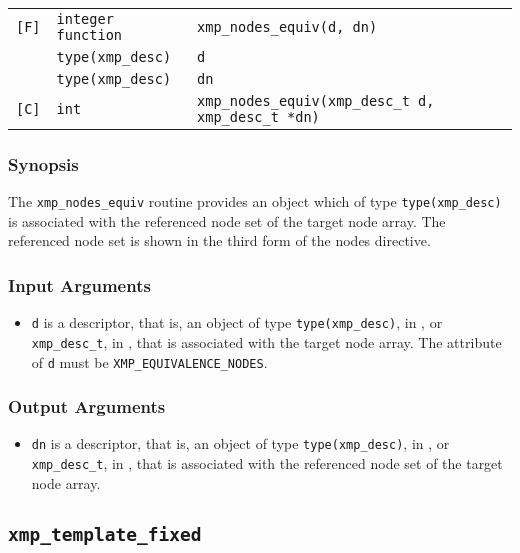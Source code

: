 \begin{tabular}{lll}

\verb![F]!& {\tt integer function}& {\tt xmp\_nodes\_equiv(d, dn)}\\
          & {\tt type(xmp\_desc)} & {\tt d}\\
          & {\tt type(xmp\_desc)} & {\tt dn}\\

\verb![C]!&  {\tt int}& {\tt xmp\_nodes\_equiv(xmp\_desc\_t d, xmp\_desc\_t *dn)}\\

\end{tabular}

\subsubsection*{Synopsis}

The {\tt xmp\_nodes\_equiv} routine provides an object which of type {\tt type(xmp\_desc)} is associated with the referenced node set of the target node array. The referenced node set is shown in the third form of the nodes directive.


\subsubsection*{Input Arguments}
\begin{itemize}
 \item {\tt d} is a descriptor, that is, an object of type 
       {\tt type(xmp\_desc)}, in {\XMPF}, or {\tt xmp\_desc\_t},
       in {\XMPC}, that is associated with the target node array.
       The attribute of {\tt d} must be {\tt XMP\_EQUIVALENCE\_NODES}.
\end{itemize}

\subsubsection*{Output Arguments}
\begin{itemize}
 \item {\tt dn} is a descriptor, that is, an object of type 
       {\tt type(xmp\_desc)}, in {\XMPF}, or {\tt xmp\_desc\_t},
       in {\XMPC}, that is associated with the referenced node set of 
       the target node array.
\end{itemize}


\subsection{\tt xmp\_template\_fixed}

